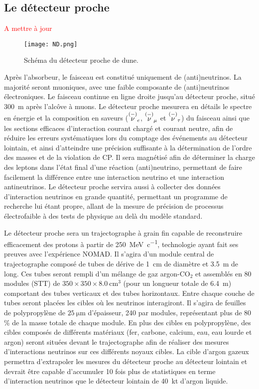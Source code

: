     \subsection{Le détecteur proche}\label{sec::near_detector}
      \textcolor{red}{A mettre à jour}

      \begin{figure}[htbp]
        \centering
        \texttt{[image: ND.png]}
        \caption[Schéma du détecteur proche de \gls{dune}]{\label{fig::ND}Schéma du détecteur proche de \gls{dune}.}
      \end{figure}
      Après l'absorbeur, le faisceau est constitué uniquement de (anti)neutrinos. La majorité seront muoniques, avec une faible composante de (anti)neutrinos électroniques. Le faisceau continue en ligne droite jusqu'au détecteur proche, situé \SI{300}{\meter} après l'alcôve à muons. Le détecteur proche mesurera en détails le spectre en énergie et la composition en saveurs ($\overset{(-)}{\nu}_e$, $\overset{(-)}{\nu}_{\mu}$ et $\overset{(-)}{\nu}_{\tau}$) du faisceau ainsi que les sections efficaces d'interaction courant chargé et courant neutre, afin de réduire les erreurs systématiques lors du comptage des événements au détecteur lointain, et ainsi d'atteindre une précision suffisante à la détermination de l'ordre des masses et de la violation de CP. Il sera magnétisé afin de déterminer la charge des leptons dans l'état final d'une réaction (anti)neutrino, permettant de faire facilement la différence entre une interaction neutrino et une interaction antineutrinos. Le détecteur proche servira aussi à collecter des données d'interaction neutrinos en grande quantité, permettant un programme de recherche lui étant propre, allant de la mesure de précision de processus électrofaible à des tests de physique au delà du modèle standard\cite{Collaboration2015}.

      Le détecteur proche sera un trajectographe à grain fin capable de reconstruire efficacement des protons à partir de \SI{250}{\mega\electronvolt\per c}, technologie ayant fait ses preuves avec l'expérience NOMAD\cite{Vannucci2014}. Il s'agira d'un module central de trajectographe composé de  tubes de dérive de \SI{1}{\centi\meter} de diamètre et \SI{3.5}{\meter} de long. Ces tubes seront rempli d'un mélange de gaz argon-CO$_2$ et assemblés en 80 modules (STT) de $350\times350\times\SI{8.0}{\centi\meter\cubed}$ (pour un longueur totale de \SI{6.4}{\meter}) comportant des tubes verticaux et des tubes horizontaux. Entre chaque couche de tubes seront placées les cibles où les neutrinos interagiront. Il s'agira de feuilles de polypropylène de $\SI{25}{\micro\meter}$ d'épaisseur, 240 par modules, représentant plus de 80\,\% de la masse totale de chaque module. En plus des cibles en polypropylène, des cibles composés de différents matériaux (fer, carbone, calcium, eau,  eau lourde et argon) seront situées devant le trajectographe afin de réaliser des mesures d'interactions neutrinos sur ces différents noyaux cibles. La cible d'argon gazeux permettra d'extrapoler les mesures du détecteur proche au détecteur lointain et devrait être capable d'accumuler 10 fois plus de statistiques en terme d'interaction neutrinos que le détecteur lointain de \SI{40}{\kilo\tonne} d'argon liquide.


